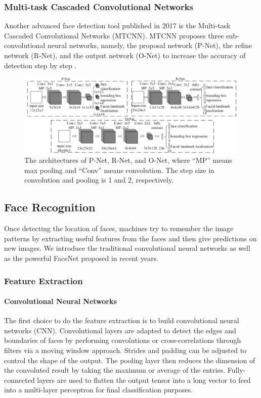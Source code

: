 \subsubsection{Multi-task Cascaded Convolutional Networks}
Another advanced face detection tool published in 2017 is the Multi-task Cascaded Convolutional Networks (MTCNN). MTCNN proposes three sub-convolutional neural networks, namely, the proposal network (P-Net), the refine network (R-Net), and the output network (O-Net) to increase the accuracy of detection step by step \cite{xiang2017joint}.   
\begin{figure}[!htbp]
    \centering\includegraphics[width=15cm]{./figures/mtcnn1.png}
    \caption{The architectures of P-Net, R-Net, and O-Net, where ``MP'' means max pooling and ``Conv'' means convolution. The step size in convolution and pooling is 1 and 2, respectively.}
    \label{pic:mtcnn1}
\end{figure}

\subsection{Face Recognition}
Once detecting the location of faces, machines try to remember the image patterns by extracting useful features from the faces and then give predictions on new images. We introduce the traditional convolutional neural networks as well as the powerful FaceNet proposed in recent years.


\subsubsection{Feature Extraction}
\paragraph{Convolutional Neural Networks}
The first choice to do the feature extraction is to build convolutional neural networks (CNN). Convolutional layers are adapted to detect the edges and boundaries of faces by performing convolutions or cross-correlations through filters via a moving window approach. Strides and padding can be adjusted to control the shape of the output. The pooling layer then reduces the dimension of the convoluted result by taking the maximum or average of the entries. Fully-connected layers are used to flatten the output tensor into a long vector
to feed into a multi-layer perceptron for final classification purposes.

